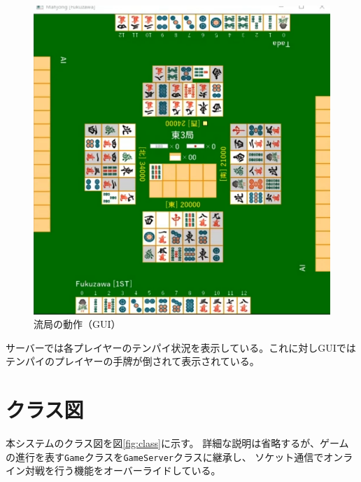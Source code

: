 \documentclass[a4j,titlepage]{jsarticle}
\begin{document}
\begin{figure}[htbp]
  \centering
  \includegraphics[width = 0.8\linewidth]{images/ryukyoku_gui.png}
  \caption{流局の動作（GUI）}
  \label{fig:ryukyoku_gui}
\end{figure}

サーバーでは各プレイヤーのテンパイ状況を表示している。これに対しGUIではテンパイのプレイヤーの手牌が倒されて表示されている。

\newpage
\section{クラス図}
本システムのクラス図を図\ref{fig:class}に示す。
詳細な説明は省略するが、ゲームの進行を表す\texttt{Game}クラスを\texttt{GameServer}クラスに継承し、
ソケット通信でオンライン対戦を行う機能をオーバーライドしている。
\end{document}
